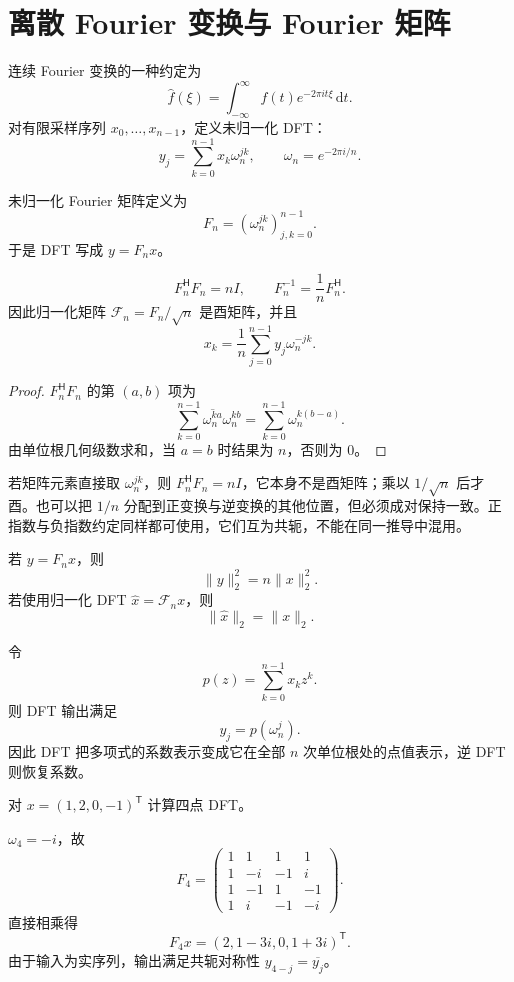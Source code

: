 \section{离散 Fourier 变换与 Fourier 矩阵}

连续 Fourier 变换的一种约定为
\[
\widehat f(\xi)=\int_{-\infty}^{\infty}f(t)e^{-2\pi i t\xi}\,\mathrm dt.
\]
对有限采样序列 $x_0,\ldots,x_{n-1}$，定义未归一化 DFT：
\[
y_j=\sum_{k=0}^{n-1}x_k\omega_n^{jk},
\qquad
\omega_n=e^{-2\pi i/n}.
\]

\begin{definition}[Fourier 矩阵]
未归一化 Fourier 矩阵定义为
\[
F_n=(\omega_n^{jk})_{j,k=0}^{n-1}.
\]
于是 DFT 写成 $y=F_nx$。
\end{definition}

\begin{theorem}
\[
F_n^{\mathsf H}F_n=nI,
\qquad
F_n^{-1}=\frac1nF_n^{\mathsf H}.
\]
因此归一化矩阵 $\mathcal F_n=F_n/\sqrt n$ 是酉矩阵，并且
\[
x_k=\frac1n\sum_{j=0}^{n-1}y_j\omega_n^{-jk}.
\]
\end{theorem}
\begin{proof}
$F_n^{\mathsf H}F_n$ 的第 $(a,b)$ 项为
\[
\sum_{k=0}^{n-1}\overline{\omega_n^{ka}}\omega_n^{kb}
=\sum_{k=0}^{n-1}\omega_n^{k(b-a)}.
\]
由单位根几何级数求和，当 $a=b$ 时结果为 $n$，否则为 $0$。
\end{proof}

\begin{pitfall}
若矩阵元素直接取 $\omega_n^{jk}$，则 $F_n^{\mathsf H}F_n=nI$，它本身不是酉矩阵；乘以 $1/\sqrt n$ 后才酉。也可以把 $1/n$ 分配到正变换与逆变换的其他位置，但必须成对保持一致。正指数与负指数约定同样都可使用，它们互为共轭，不能在同一推导中混用。
\end{pitfall}

\begin{corollary}[Parseval 等式]
若 $y=F_nx$，则
\[
\lVert y\rVert_2^2=n\lVert x\rVert_2^2.
\]
若使用归一化 DFT $\widehat x=\mathcal F_nx$，则
\[
\lVert\widehat x\rVert_2=\lVert x\rVert_2.
\]
\end{corollary}

\begin{proposition}
令
\[
p(z)=\sum_{k=0}^{n-1}x_kz^k.
\]
则 DFT 输出满足
\[
y_j=p(\omega_n^j).
\]
因此 DFT 把多项式的系数表示变成它在全部 $n$ 次单位根处的点值表示，逆 DFT 则恢复系数。
\end{proposition}

\begin{example}[title={四点 DFT}]
对 $x=(1,2,0,-1)^{\mathsf T}$ 计算四点 DFT。
\begin{solution}
$\omega_4=-i$，故
\[
F_4=\begin{pmatrix}
1&1&1&1\\
1&-i&-1&i\\
1&-1&1&-1\\
1&i&-1&-i
\end{pmatrix}.
\]
直接相乘得
\[
F_4x=(2,1-3i,0,1+3i)^{\mathsf T}.
\]
由于输入为实序列，输出满足共轭对称性 $y_{4-j}=\overline{y_j}$。
\end{solution}
\end{example}

